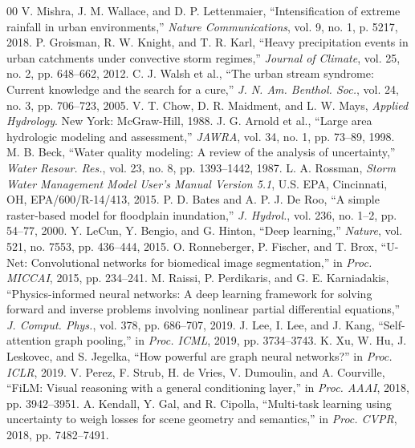 \documentclass[conference]{IEEEtran}
\begin{document}
\begin{thebibliography}{00}
 V. Mishra, J. M. Wallace, and D. P. Lettenmaier, ``Intensification of extreme rainfall in urban environments,'' \textit{Nature Communications}, vol. 9, no. 1, p. 5217, 2018.
 P. Groisman, R. W. Knight, and T. R. Karl, ``Heavy precipitation events in urban catchments under convective storm regimes,'' \textit{Journal of Climate}, vol. 25, no. 2, pp. 648--662, 2012.
 C. J. Walsh et al., ``The urban stream syndrome: Current knowledge and the search for a cure,'' \textit{J. N. Am. Benthol. Soc.}, vol. 24, no. 3, pp. 706--723, 2005.
 V. T. Chow, D. R. Maidment, and L. W. Mays, \textit{Applied Hydrology}. New York: McGraw-Hill, 1988.
 J. G. Arnold et al., ``Large area hydrologic modeling and assessment,'' \textit{JAWRA}, vol. 34, no. 1, pp. 73--89, 1998.
 M. B. Beck, ``Water quality modeling: A review of the analysis of uncertainty,'' \textit{Water Resour. Res.}, vol. 23, no. 8, pp. 1393--1442, 1987.
 L. A. Rossman, \textit{Storm Water Management Model User's Manual Version 5.1}, U.S. EPA, Cincinnati, OH, EPA/600/R-14/413, 2015.
 P. D. Bates and A. P. J. De Roo, ``A simple raster-based model for floodplain inundation,'' \textit{J. Hydrol.}, vol. 236, no. 1--2, pp. 54--77, 2000.
 Y. LeCun, Y. Bengio, and G. Hinton, ``Deep learning,'' \textit{Nature}, vol. 521, no. 7553, pp. 436--444, 2015.
 O. Ronneberger, P. Fischer, and T. Brox, ``U-Net: Convolutional networks for biomedical image segmentation,'' in \textit{Proc. MICCAI}, 2015, pp. 234--241.
 M. Raissi, P. Perdikaris, and G. E. Karniadakis, ``Physics-informed neural networks: A deep learning framework for solving forward and inverse problems involving nonlinear partial differential equations,'' \textit{J. Comput. Phys.}, vol. 378, pp. 686--707, 2019.
 J. Lee, I. Lee, and J. Kang, ``Self-attention graph pooling,'' in \textit{Proc. ICML}, 2019, pp. 3734--3743.
 K. Xu, W. Hu, J. Leskovec, and S. Jegelka, ``How powerful are graph neural networks?'' in \textit{Proc. ICLR}, 2019.
 V. Perez, F. Strub, H. de Vries, V. Dumoulin, and A. Courville, ``FiLM: Visual reasoning with a general conditioning layer,'' in \textit{Proc. AAAI}, 2018, pp. 3942--3951.
 A. Kendall, Y. Gal, and R. Cipolla, ``Multi-task learning using uncertainty to weigh losses for scene geometry and semantics,'' in \textit{Proc. CVPR}, 2018, pp. 7482--7491.

\end{thebibliography}
\end{document}
